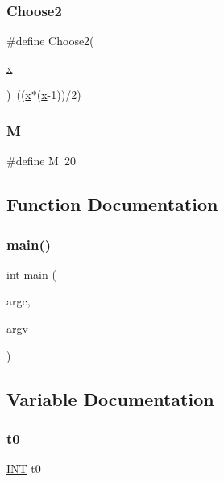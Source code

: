 \subsubsection{\texorpdfstring{Choose2}{Choose2}}
{\footnotesize\ttfamily \#define Choose2(\begin{DoxyParamCaption}\item[{}]{\mbox{\hyperlink{alphabet2_8_c_a6150e0515f7202e2fb518f7206ed97dc}{x}} }\end{DoxyParamCaption})~((\mbox{\hyperlink{alphabet2_8_c_a6150e0515f7202e2fb518f7206ed97dc}{x}}$\ast$(\mbox{\hyperlink{alphabet2_8_c_a6150e0515f7202e2fb518f7206ed97dc}{x}}-\/1))/2)}

\mbox{\label{maxfit_8_c_a52037c938e3c1b126c6277da5ca689d0}} 
\subsubsection{\texorpdfstring{M}{M}}
{\footnotesize\ttfamily \#define M~20}



\subsection{Function Documentation}
\mbox{\label{maxfit_8_c_a3c04138a5bfe5d72780bb7e82a18e627}} 
\subsubsection{\texorpdfstring{main()}{main()}}
{\footnotesize\ttfamily int main (\begin{DoxyParamCaption}\item[{int}]{argc,  }\item[{char $\ast$$\ast$}]{argv }\end{DoxyParamCaption})}



\subsection{Variable Documentation}
\mbox{\label{maxfit_8_c_a4268f4fe222ffb119218a0199f5e1904}} 
\subsubsection{\texorpdfstring{t0}{t0}}
{\footnotesize\ttfamily \mbox{\hyperlink{galois_8h_a09fddde158a3a20bd2dcadb609de11dc}{I\+NT}} t0}

